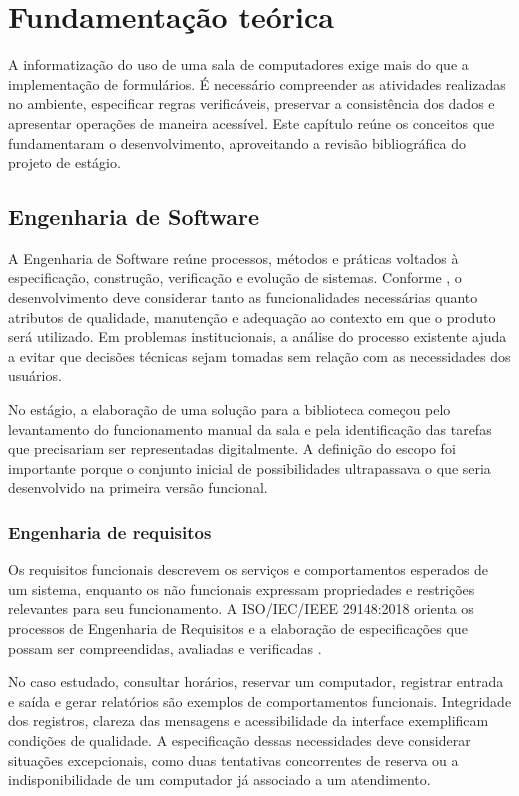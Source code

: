 \chapter{Fundamentação teórica}\label{cap:fundamentacao}

A informatização do uso de uma sala de computadores exige mais do que a implementação de formulários. É necessário compreender as atividades realizadas no ambiente, especificar regras verificáveis, preservar a consistência dos dados e apresentar operações de maneira acessível. Este capítulo reúne os conceitos que fundamentaram o desenvolvimento, aproveitando a revisão bibliográfica do projeto de estágio.

\section{Engenharia de Software}\label{sec:engenharia}

A Engenharia de Software reúne processos, métodos e práticas voltados à especificação, construção, verificação e evolução de sistemas. Conforme , o desenvolvimento deve considerar tanto as funcionalidades necessárias quanto atributos de qualidade, manutenção e adequação ao contexto em que o produto será utilizado. Em problemas institucionais, a análise do processo existente ajuda a evitar que decisões técnicas sejam tomadas sem relação com as necessidades dos usuários.

No estágio, a elaboração de uma solução para a biblioteca começou pelo levantamento do funcionamento manual da sala e pela identificação das tarefas que precisariam ser representadas digitalmente. A definição do escopo foi importante porque o conjunto inicial de possibilidades ultrapassava o que seria desenvolvido na primeira versão funcional.

\subsection{Engenharia de requisitos}

Os requisitos funcionais descrevem os serviços e comportamentos esperados de um sistema, enquanto os não funcionais expressam propriedades e restrições relevantes para seu funcionamento. A ISO/IEC/IEEE 29148:2018 orienta os processos de Engenharia de Requisitos e a elaboração de especificações que possam ser compreendidas, avaliadas e verificadas \cite{iso29148_2018}.

No caso estudado, consultar horários, reservar um computador, registrar entrada e saída e gerar relatórios são exemplos de comportamentos funcionais. Integridade dos registros, clareza das mensagens e acessibilidade da interface exemplificam condições de qualidade. A especificação dessas necessidades deve considerar situações excepcionais, como duas tentativas concorrentes de reserva ou a indisponibilidade de um computador já associado a um atendimento.

